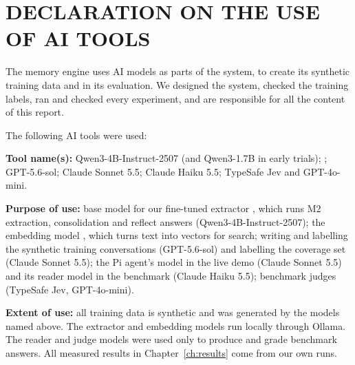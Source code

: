\chapter*{\uppercase{DECLARATION ON THE USE OF AI TOOLS}}
The memory engine uses AI models as parts of the system, to create its synthetic training data
and in its evaluation. We designed the system, checked the training labels, ran and checked
every experiment, and are responsible for all the content of this report.

The following AI tools were used:

\textbf{Tool name(s):} Qwen3-4B-Instruct-2507 (and Qwen3-1.7B in early trials);
; GPT-5.6-sol; Claude Sonnet 5.5; Claude Haiku 5.5; TypeSafe Jev and
GPT-4o-mini.

\textbf{Purpose of use:} base model for our fine-tuned extractor , which
runs M2 extraction, consolidation and reflect answers (Qwen3-4B-Instruct-2507); the embedding
model , which turns text into vectors for search; writing and labelling the synthetic training
conversations (GPT-5.6-sol) and labelling the coverage set (Claude Sonnet 5.5); the Pi agent's
model in the live demo (Claude Sonnet 5.5) and its reader model in the benchmark (Claude Haiku 5.5); benchmark judges (TypeSafe Jev,
GPT-4o-mini).

\textbf{Extent of use:} all training data is synthetic and was generated by the models named
above. The extractor and embedding models run locally through Ollama. The reader and judge
models were used only to produce and grade benchmark answers. All measured results in
Chapter~\ref{ch:results} come from our own runs.
